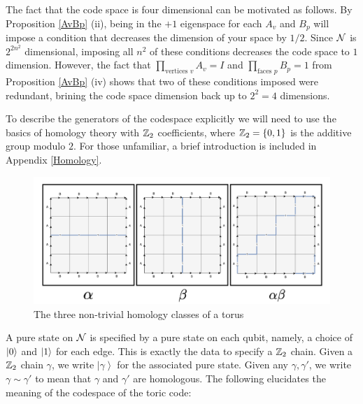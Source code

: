 \documentclass{article}
\theoremstyle{definition}
\numberwithin{figure}{section}
\begin{document}
The fact that the code space is four dimensional can be motivated as follows. By Proposition \ref{AvBp} (ii), being in the $+1$ eigenspace for each $A_v$ and $B_p$ will impose a condition that decreases the dimension of your space by $1/2$. Since $\mathcal{N}$ is $2^{2n^2}$ dimensional, imposing all $n^2$ of these conditions decreases the code space to $1$ dimension. However, the fact that $\prod_{\text{vertices }v}A_v=I$ and $\prod_{\text{faces }p}B_p=1$  from Proposition \ref{AvBp} (iv) shows that two of these conditions imposed were redundant, brining the code space dimension back up to $2^2=4$ dimensions.

To describe the generators of the codespace explicitly we will need to use the basics of homology theory with $\mathbb{Z}_2$ coefficients, where $\mathbb{Z}_2=\{0,1\}$ is the additive group modulo $2$. For those unfamiliar, a brief introduction is included in Appendix \ref{Homology}.

\begin{figure}
\begin{center}
\includegraphics[scale=0.35]{homology-classes}
\caption{The three non-trivial homology classes of a torus}
\label{fig:homology}
\end{center}
\end{figure}


A pure state on $\mathcal{N}$ is specified by a pure state on each qubit, namely, a choice of $\left|0\right>$ and $\left|1\right>$ for each edge. This is exactly the data to specify a $\mathbb{Z}_2$ chain. Given a $\mathbb{Z}_2$ chain $\gamma$, we write $\left|\gamma\right>$ for the associated pure state. Given any $\gamma,\gamma'$, we write $\gamma\sim \gamma'$ to mean that $\gamma$ and $\gamma'$ are homologous. The following elucidates the meaning of the codespace of the toric code:
\end{document}
